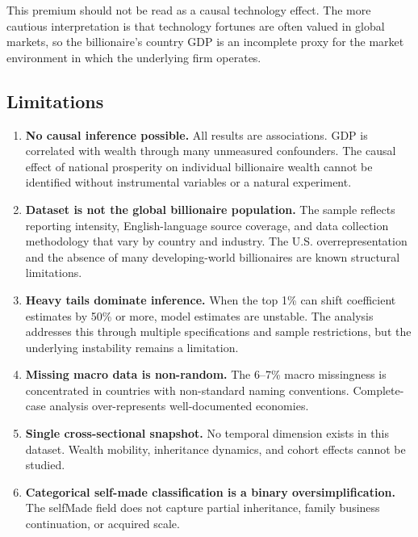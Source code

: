 \documentclass[a4paper,10pt]{article}
\begin{document}
This premium should not be read as a causal technology effect. The more cautious interpretation is that technology fortunes are often valued in global markets, so the billionaire's country GDP is an incomplete proxy for the market environment in which the underlying firm operates.

\bigskip

\subsection{Limitations}

\begin{enumerate}
  \item \textbf{No causal inference possible.} All results are associations. GDP is correlated with wealth through many unmeasured confounders. The causal effect of national prosperity on individual billionaire wealth cannot be identified without instrumental variables or a natural experiment.

  \item \textbf{Dataset is not the global billionaire population.} The sample reflects reporting intensity, English-language source coverage, and data collection methodology that vary by country and industry. The U.S. overrepresentation and the absence of many developing-world billionaires are known structural limitations.

  \item \textbf{Heavy tails dominate inference.} When the top 1\% can shift coefficient estimates by 50\% or more, model estimates are unstable. The analysis addresses this through multiple specifications and sample restrictions, but the underlying instability remains a limitation.

  \item \textbf{Missing macro data is non-random.} The 6--7\% macro missingness is concentrated in countries with non-standard naming conventions. Complete-case analysis over-represents well-documented economies.

  \item \textbf{Single cross-sectional snapshot.} No temporal dimension exists in this dataset. Wealth mobility, inheritance dynamics, and cohort effects cannot be studied.

  \item \textbf{Categorical self-made classification is a binary oversimplification.} The selfMade field does not capture partial inheritance, family business continuation, or acquired scale.
\end{enumerate}
\end{document}

